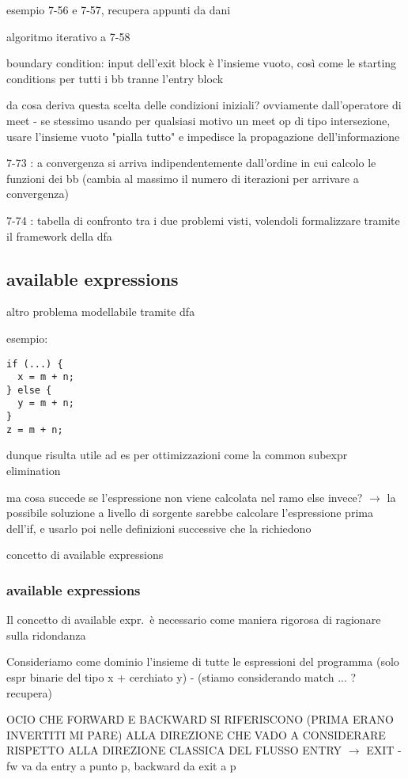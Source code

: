esempio 7-56 e 7-57, recupera appunti da dani

algoritmo iterativo a 7-58

boundary condition: input dell'exit block \`e l'insieme vuoto, cos\`i come le starting conditions per tutti i bb tranne l'entry block

da cosa deriva questa scelta delle condizioni iniziali? ovviamente dall'operatore di meet - se stessimo usando per qualsiasi motivo un meet op di tipo intersezione, usare l'insieme vuoto "pialla tutto" e impedisce la propagazione dell'informazione

7-73 : a convergenza si arriva indipendentemente dall'ordine in cui calcolo le funzioni dei bb (cambia al massimo il numero di iterazioni per arrivare a convergenza)

7-74 : tabella di confronto tra i due problemi visti, volendoli formalizzare tramite il framework della dfa

\subsection{available expressions}

altro problema modellabile tramite dfa

esempio:
\begin{lstlisting}
if (...) {
  x = m + n;
} else {
  y = m + n;
}
z = m + n;\end{lstlisting}

dunque risulta utile ad es per ottimizzazioni come la common subexpr elimination

ma cosa succede se l'espressione non viene calcolata nel ramo else invece? $\rightarrow$ la possibile soluzione a livello di sorgente sarebbe calcolare l'espressione prima dell'if, e usarlo poi nelle definizioni successive che la richiedono

concetto di available expressions

\subsubsection{available expressions}

Il concetto di available expr.~\`e necessario come maniera rigorosa di ragionare sulla ridondanza

Consideriamo come dominio l'insieme di tutte le espressioni del programma (solo espr binarie del tipo x + cerchiato y) - (stiamo considerando match ... ? recupera)

OCIO CHE FORWARD E BACKWARD SI RIFERISCONO (PRIMA ERANO INVERTITI MI PARE) ALLA DIREZIONE CHE VADO A CONSIDERARE RISPETTO ALLA DIREZIONE CLASSICA DEL FLUSSO ENTRY $\rightarrow$ EXIT - fw va da entry a punto p, backward da exit a p

